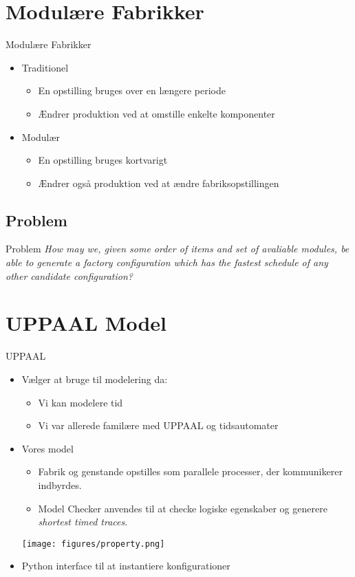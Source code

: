 \section{Modulære Fabrikker}

\begin{frame}{Modulære Fabrikker}{}
  
  \begin{itemize}
  \item<1-> Traditionel
    \begin{itemize}
    \item En opstilling bruges over en længere periode
    \item Ændrer produktion ved at omstille enkelte komponenter 
    \end{itemize}
  \item<2-> Modulær
    \begin{itemize}
    \item En opstilling bruges kortvarigt
    \item Ændrer også produktion ved at ændre fabriksopstillingen
    \end{itemize}
  \end{itemize}
\end{frame}

\subsection{Problem}

\begin{frame}{Problem}{}
\textit{How may we, given some order of items and set of avaliable modules, be able to
generate a factory configuration which has the fastest schedule of any other candidate
configuration?}
\end{frame}

\section{UPPAAL Model}
\begin{frame}{UPPAAL}{}
  \begin{itemize}
  \item<1->  Vælger at bruge til modelering da:
  \begin{itemize}
  \item Vi kan modelere tid
  \item Vi var allerede familære med UPPAAL og tidsautomater
  \end{itemize}
  \item<2-> Vores model
	\begin{itemize}
	\item  Fabrik og genstande opstilles som parallele processer, der kommunikerer indbyrdes.   
	\item Model Checker anvendes til at checke logiske egenskaber og generere \textit{shortest timed traces}.	
\end{itemize}	  
    \texttt{[image: figures/property.png]}   
    
    \item<3-> Python interface til at instantiere konfigurationer
  \end{itemize}
\end{frame}

